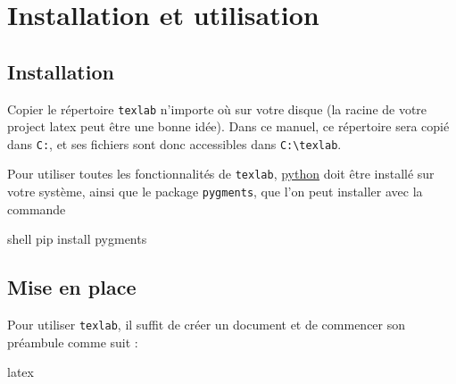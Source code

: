 
\section{Installation et utilisation}
    \subsection{Installation}
        Copier le répertoire \verb|texlab| n'importe où sur votre disque (la racine de votre project latex peut être une bonne idée). Dans ce manuel, ce répertoire sera copié dans \verb|C:|, et ses fichiers sont donc accessibles dans \verb|C:\texlab|.

        Pour utiliser toutes les fonctionnalités de \verb|texlab|, \href{https://www.python.org/}{python} doit être installé sur votre système, ainsi que le package \verb|pygments|, que l'on peut installer avec la commande
        \begin{code}{shell}
             pip install pygments
        \end{code} 

    \subsection{Mise en place}
        Pour utiliser \verb|texlab|, il suffit de créer un document et de commencer son préambule comme suit :
        \begin{code}{latex}
            \newcommand{\templatesroot}{C:/texlab}
            
        \end{code}